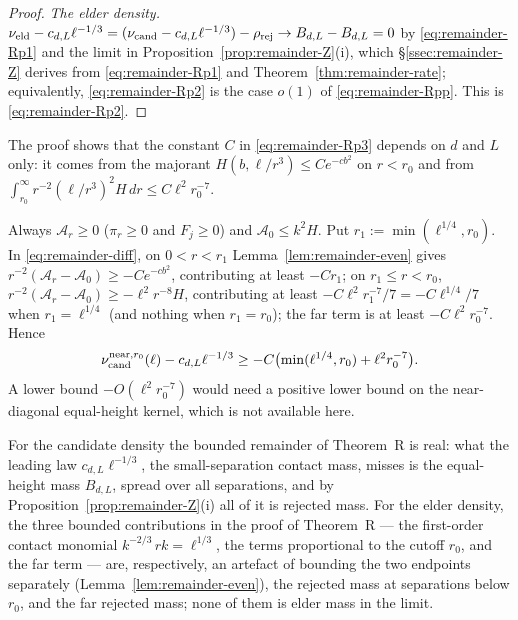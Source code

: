 \begin{proof}
\emph{The elder density.} $\nu_{\mathrm{eld}}-c_{d,L}\ell^{-1/3}=(\nu_{\mathrm{cand}}-c_{d,L}\ell^{-1/3})-\rho_{\mathrm{rej}}\to B_{d,L}-B_{d,L}=0$ by \eqref{eq:remainder-Rp1} and the limit in Proposition~\ref{prop:remainder-Z}(i), which \S\ref{ssec:remainder-Z} derives from \eqref{eq:remainder-Rp1} and Theorem~\ref{thm:remainder-rate}; equivalently, \eqref{eq:remainder-Rp2} is the case $o(1)$ of \eqref{eq:remainder-Rpp}. This is \eqref{eq:remainder-Rp2}.
\end{proof}

The proof shows that the constant $C$ in \eqref{eq:remainder-Rp3} depends on $d$ and $L$ only: it comes from the majorant $H(b,\ell/r^3)\le Ce^{-cb^2}$ on $r<r_0$ and from $\int_{r_0}^\infty r^{-2}(\ell/r^3)^2H\,dr\le C\ell^2r_0^{-7}$.

\begin{remark}\label{rem:remainder-signed}
Always $\mathcal A_r\ge0$ ($\pi_r\ge0$ and $F_j\ge0$) and $\mathcal A_0\le k^2H$. Put $r_1:=\min(\ell^{1/4},r_0)$. In \eqref{eq:remainder-diff}, on $0<r<r_1$ Lemma~\ref{lem:remainder-even} gives $r^{-2}(\mathcal A_r-\mathcal A_0)\ge-Ce^{-cb^2}$, contributing at least $-Cr_1$; on $r_1\le r<r_0$, $r^{-2}(\mathcal A_r-\mathcal A_0)\ge-\ell^2r^{-8}H$, contributing at least $-C\ell^2r_1^{-7}/7=-C\ell^{1/4}/7$ when $r_1=\ell^{1/4}$ (and nothing when $r_1=r_0$); the far term is at least $-C\ell^2r_0^{-7}$. Hence
\[
\nu_{\mathrm{cand}}^{\mathrm{near},r_0}(\ell)-c_{d,L}\ell^{-1/3}\ge-C\bigl(\min(\ell^{1/4},r_0)+\ell^2r_0^{-7}\bigr).
\]
A lower bound $-O(\ell^2r_0^{-7})$ would need a positive lower bound on the near-diagonal equal-height kernel, which is not available here.
\end{remark}

\begin{remark}\label{rem:remainder-where}
For the candidate density the bounded remainder of Theorem~R is real: what the leading law $c_{d,L}\ell^{-1/3}$, the small-separation contact mass, misses is the equal-height mass $B_{d,L}$, spread over all separations, and by Proposition~\ref{prop:remainder-Z}(i) all of it is rejected mass. For the elder density, the three bounded contributions in the proof of Theorem~R --- the first-order contact monomial $k^{-2/3}\,rk=\ell^{1/3}$, the terms proportional to the cutoff $r_0$, and the far term --- are, respectively, an artefact of bounding the two endpoints separately (Lemma~\ref{lem:remainder-even}), the rejected mass at separations below $r_0$, and the far rejected mass; none of them is elder mass in the limit.
\end{remark}

